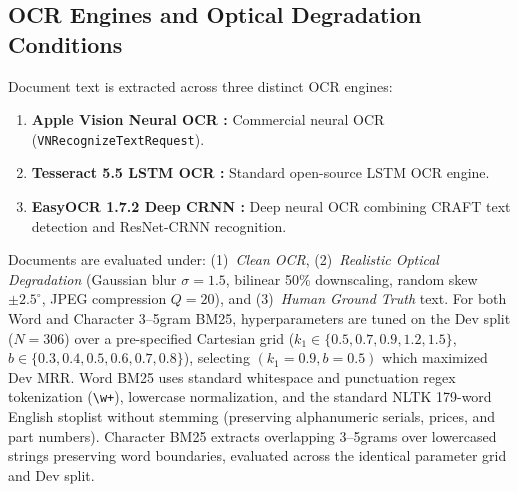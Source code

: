 \subsection{OCR Engines and Optical Degradation Conditions}
Document text is extracted across three distinct OCR engines:
\begin{enumerate}
    \setlength{\itemsep}{0.2pt plus 0.1pt}
    \setlength{\parskip}{0pt}
    \item \textbf{Apple Vision Neural OCR \cite{apple2020vision}:} Commercial neural OCR (\texttt{VNRecognizeTextRequest}).
    \item \textbf{Tesseract 5.5 LSTM OCR \cite{smith2007tesseract}:} Standard open-source LSTM OCR engine.
    \item \textbf{EasyOCR 1.7.2 Deep CRNN \cite{jaidedai2020easyocr}:} Deep neural OCR combining CRAFT text detection and ResNet-CRNN recognition.
\end{enumerate}
Documents are evaluated under: (1)~\emph{Clean OCR}, (2)~\emph{Realistic Optical Degradation} (Gaussian blur $\sigma=1.5$, bilinear 50\% downscaling, random skew $\pm 2.5^\circ$, JPEG compression $Q=20$), and (3)~\emph{Human Ground Truth} text. For both Word and Character 3--5gram BM25, hyperparameters are tuned on the Dev split ($N=306$) over a pre-specified Cartesian grid ($k_1 \in \{0.5, 0.7, 0.9, 1.2, 1.5\}$, $b \in \{0.3, 0.4, 0.5, 0.6, 0.7, 0.8\}$), selecting $(k_1=0.9, b=0.5)$ which maximized Dev MRR. Word BM25 uses standard whitespace and punctuation regex tokenization (\texttt{\textbackslash w+}), lowercase normalization, and the standard NLTK 179-word English stoplist without stemming (preserving alphanumeric serials, prices, and part numbers). Character BM25 extracts overlapping 3--5grams over lowercased strings preserving word boundaries, evaluated across the identical parameter grid and Dev split.

